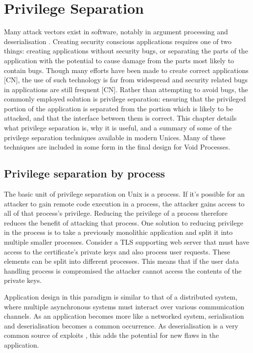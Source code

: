 \documentclass[12pt,a4paper,twoside]{report}
\begin{document}
\chapter{Privilege Separation}
\label{chap:priv-sep}

Many attack vectors exist in software, notably in argument processing and deserialisation \citep{the_mitre_corporation_improper_2006,the_mitre_corporation_deserialization_2006}. Creating security conscious applications requires one of two things: creating applications without security bugs, or separating the parts of the application with the potential to cause damage from the parts most likely to contain bugs. Though many efforts have been made to create correct applications [CN], the use of such technology is far from widespread and security related bugs in applications are still frequent [CN]. Rather than attempting to avoid bugs, the commonly employed solution is privilege separation: ensuring that the privileged portion of the application is separated from the portion which is likely to be attacked, and that the interface between them is correct. This chapter details what privilege separation is, why it is useful, and a summary of some of the privilege separation techniques available in modern Unices. Many of these techniques are included in some form in the final design for Void Processes.

\section{Privilege separation by process}

The basic unit of privilege separation on Unix is a process. If it's possible for an attacker to gain remote code execution in a process, the attacker gains access to all of that process's privilege. Reducing the privilege of a process therefore reduces the benefit of attacking that process. One solution to reducing privilege in the process is to take a previously monolithic application and split it into multiple smaller processes. Consider a TLS supporting web server that must have access to the certificate's private keys and also process user requests. These elements can be split into different processes. This means that if the user data handling process is compromised the attacker cannot access the contents of the private keys.

Application design in this paradigm is similar to that of a distributed system, where multiple asynchronous systems must interact over various communication channels. As an application becomes more like a networked system, serialisation and deserialisation becomes a common occurrence. As deserialisation is a very common source of exploits \citep{the_mitre_corporation_deserialization_2006}, this adds the potential for new flaws in the application.
\end{document}
